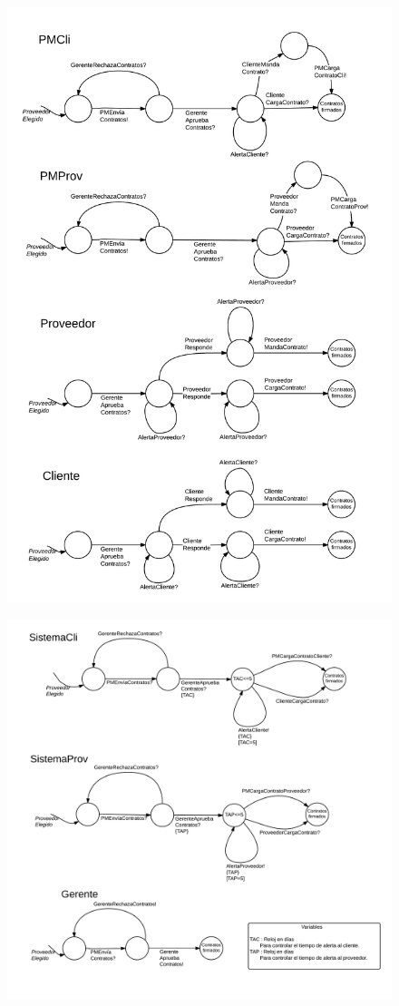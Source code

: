 \begin{figure}[H]
\includegraphics[width=0.8\linewidth]{diag/nuevos/fsm-firmcont1.png}
\label{fsm-firmcont1}
\end{figure}

\begin{figure}[H]
\includegraphics[width=0.8\linewidth]{diag/nuevos/fsm-firmcont2.png}
\label{fsm-firmcont2}
\end{figure}
